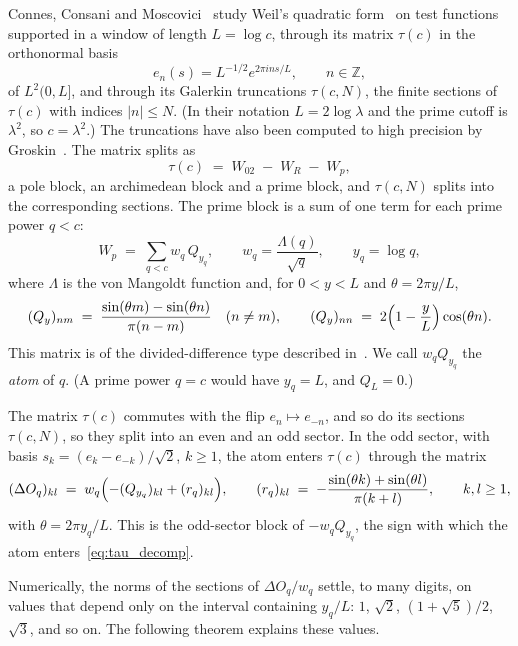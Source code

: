 \documentclass[11pt,a4paper]{article}
\theoremstyle{plain}
\theoremstyle{definition}
\theoremstyle{remark}
\newcommand{\Z}{\mathbb{Z}}
\begin{document}
Connes, Consani and Moscovici~\cite{CCM2025} study Weil's quadratic form~\cite{Weil1952} on test functions supported in a window of length $L = \log c$, through its matrix $\tau(c)$ in the orthonormal basis
\[
  e_n(s) = L^{-1/2} e^{2\pi i n s/L}, \qquad n \in \Z,
\]
of $L^2(0, L]$, and through its Galerkin truncations $\tau(c, N)$, the finite sections of $\tau(c)$ with indices $|n| \le N$. (In their notation $L = 2\log\lambda$ and the prime cutoff is $\lambda^2$, so $c = \lambda^2$.) The truncations have also been computed to high precision by Groskin~\cite{Groskin2026}. The matrix splits as
\begin{equation}\label{eq:tau_decomp}
  \tau(c) \;=\; W_{02} \;-\; W_R \;-\; W_p,
\end{equation}
a pole block, an archimedean block and a prime block, and $\tau(c, N)$ splits into the corresponding sections. The prime block is a sum of one term for each prime power $q < c$:
\begin{equation}\label{eq:Wp}
  W_p \;=\; \sum_{q < c} w_q\, Q_{y_q}, \qquad w_q = \frac{\Lambda(q)}{\sqrt q}, \qquad y_q = \log q,
\end{equation}
where $\Lambda$ is the von Mangoldt function and, for $0 < y < L$ and $\theta = 2\pi y/L$,
\begin{equation}\label{eq:Q}
  (Q_y)_{nm} \;=\; \frac{\sin(\theta m) - \sin(\theta n)}{\pi(n-m)} \quad (n \ne m), \qquad (Q_y)_{nn} \;=\; 2\Bigl(1 - \frac yL\Bigr)\cos(\theta n).
\end{equation}
This matrix is of the divided-difference type described in~\cite[Proposition~4.1]{CvS2025}. We call $w_q Q_{y_q}$ the \emph{atom} of $q$. (A prime power $q = c$ would have $y_q = L$, and $Q_L = 0$.)

The matrix $\tau(c)$ commutes with the flip $e_n \mapsto e_{-n}$, and so do its sections $\tau(c,N)$, so they split into an even and an odd sector. In the odd sector, with basis $s_k = (e_k - e_{-k})/\sqrt 2$, $k \ge 1$, the atom enters $\tau(c)$ through the matrix
\begin{equation}\label{eq:atom_odd}
  (\Delta O_q)_{kl} \;=\; w_q\Bigl(-(Q_{y_q})_{kl} + (r_q)_{kl}\Bigr), \qquad (r_q)_{kl} \;=\; -\frac{\sin(\theta k) + \sin(\theta l)}{\pi(k+l)}, \qquad k, l \ge 1,
\end{equation}
with $\theta = 2\pi y_q/L$. This is the odd-sector block of $-w_q Q_{y_q}$, the sign with which the atom enters~\eqref{eq:tau_decomp}.

Numerically, the norms of the sections of $\Delta O_q/w_q$ settle, to many digits, on values that depend only on the interval containing $y_q/L$: $1$, $\sqrt 2$, ${(1+\sqrt 5)/2}$, $\sqrt 3$, and so on. The following theorem explains these values.
\end{document}
